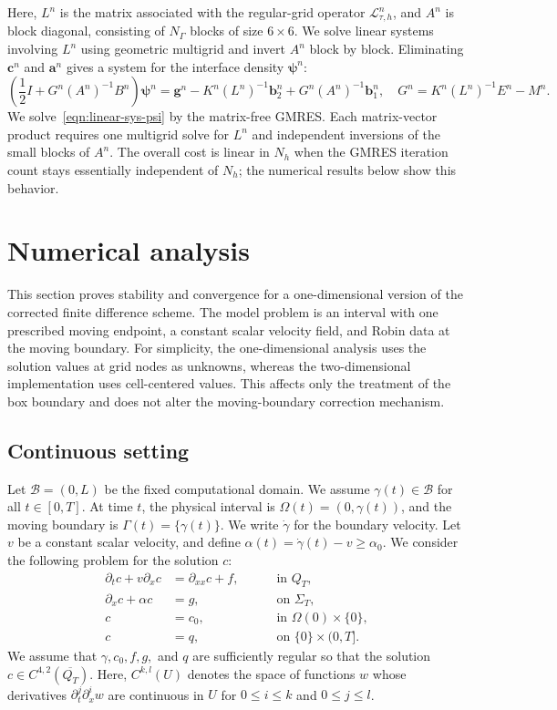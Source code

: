 \documentclass[11pt,reqno]{amsart}
\theoremstyle{plain}
\theoremstyle{definition}
\numberwithin{equation}{section}
\newcommand{\paren}[1]{\left(#1\right)}
\newcommand{\p}{\partial}
\newcommand{\mc}[1]{\mathcal{#1}}
\newcommand{\bm}[1]{\boldsymbol{#1}}
\begin{document}
Here, $L^n$ is the matrix associated with the regular-grid operator
$\mc L_{\tau,h}^n$, and $A^n$ is block diagonal, consisting of
$N_\Gamma$ blocks of size $6\times6$. We solve linear systems involving
$L^n$ using geometric multigrid and invert $A^n$ block by block.
Eliminating $\bm c^n$ and $\bm a^n$ gives a system for the interface density $\bm \psi^n$:
\begin{equation}\label{eqn:linear-sys-psi}
  \paren{ \frac{1}{2} I + G^n (A^n)^{-1} B^n } \bm \psi^n = \bm g^n - K^n (L^n)^{-1}\bm b_2^n + G^n (A^n)^{-1}\bm b_1^n,\quad G^n = K^n (L^n)^{-1}E^n - M^n.
\end{equation}
We solve~\eqref{eqn:linear-sys-psi} by the matrix-free GMRES. Each matrix-vector product requires one multigrid solve for $L^n$ and independent inversions of the small blocks of $A^n$. The overall cost is linear in $N_h$ when the GMRES iteration count stays essentially independent of $N_h$; the numerical results below show this behavior.


\section{Numerical analysis}\label{sec:numerical-analysis}
This section proves stability and convergence for a one-dimensional version of
the corrected finite difference scheme. The model problem is an interval with
one prescribed moving endpoint, a constant scalar velocity field, and Robin data at
the moving boundary.
For simplicity, the one-dimensional analysis uses the solution values at grid nodes as unknowns, whereas the two-dimensional implementation uses cell-centered values. This affects only the treatment of the box boundary and does not alter the moving-boundary correction mechanism.

\subsection{Continuous setting}
Let $\mc B=(0,L)$ be the fixed computational domain. We assume $\gamma(t)\in\mc B$ for all $t\in[0,T]$. At time
$t$, the physical interval is $\Omega(t)=(0,\gamma(t))$, and the moving
boundary is $\Gamma(t)=\{\gamma(t)\}$. We write $\dot\gamma$ for the boundary velocity. 
Let $v$ be a constant scalar velocity, and define $\alpha(t) = \dot{\gamma}(t)-v \ge \alpha_0$.
We consider the following problem for the solution $c$:
\begin{equation}\label{eqn:prob-1d}
\begin{aligned}
    \p_t c + v\p_x c &= \p_{xx} c + f,\quad && \text{ in } Q_T, \\
    \p_x c + \alpha c &= g, \quad &&\text{ on }\Sigma_T,\\
    c &= c_0, \quad && \text{ in }\Omega(0)\times\{0\}, \\
    c &= q, \quad && \text{ on }\{0\}\times (0,T].
\end{aligned}
\end{equation}
We assume that $\gamma, c_0, f, g,$ and $q$ are sufficiently regular so that the solution $c \in C^{4,2}(\overline{Q_T})$.
Here, $C^{k,l}(U)$ denotes the space of functions $w$ whose derivatives
$\partial_t^j\partial_x^i w$ are continuous in $U$ for $0\le i\le k$ and
$0\le j\le l$.
\end{document}
